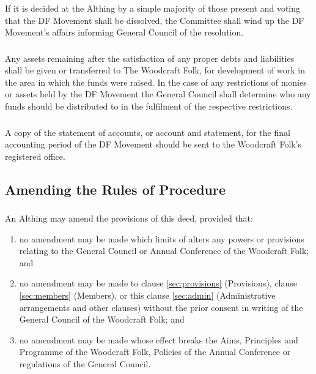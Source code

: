 \documentclass[a4paper, 11pt]{report}
\begin{document}
\subsubsection{}
If it is decided at the Althing by a simple majority of those present and voting that the DF Movement shall be dissolved, the Committee shall wind up the DF Movement's affairs informing General Council of the resolution.
\subsubsection{}
Any assets remaining after the satisfaction of any proper debts and liabilities shall be given or transferred to The Woodcraft Folk, for development of work in the area in which the funds were raised. In the case of any restrictions of monies or assets held by the DF Movement the General Council shall determine who any funds should be distributed to in the fulfilment of the respective restrictions.
\subsubsection{}
A copy of the statement of accounts, or account and statement, for the final accounting period of the DF Movement should be sent to the Woodcraft Folk's registered office.

\subsection{Amending the Rules of Procedure}
\subsubsection{}
An Althing may amend the provisions of this deed, provided that:
\begin{enumerate}[\hspace{0.5cm}(a)]
\item no amendment may be made which limits of alters any powers or provisions relating to the General Council or Annual Conference of the Woodcraft Folk; and
\item no amendment may be made to clause \ref{sec:provisions} (Provisions), clause \ref{sec:members} (Members), or this clause \ref{sec:admin} (Administrative arrangements and other clauses) without the prior consent in writing of the General Council of the Woodcraft Folk; and
\item no amendment may be made whose effect breaks the Aims, Principles and Programme of the Woodcraft Folk, Policies of the Annual Conference or regulations of the General Council.
\end{enumerate}
\end{document}
